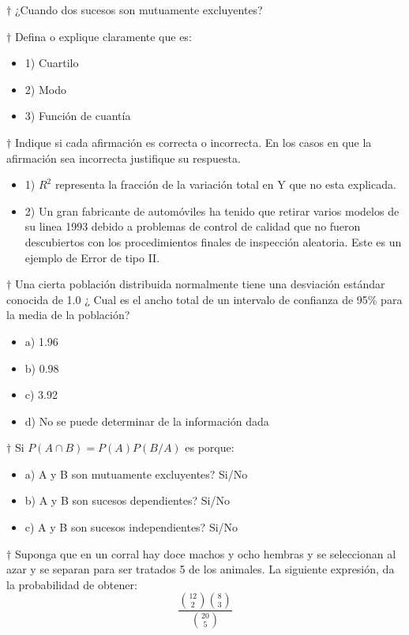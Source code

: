 \documentclass[10pt,a4paper]{article}
\begin{document}
$\dagger$ ¿Cuando dos sucesos son mutuamente excluyentes?

$\dagger$ Defina o explique claramente que es:
\begin{itemize}
	\item 1) Cuartilo
	\item 2) Modo
	\item 3) Función de cuantía
\end{itemize}

$\dagger$ Indique si cada afirmación es correcta o incorrecta. En los casos en que la afirmación sea incorrecta justifique su respuesta.
\begin{itemize}
	\item 1) $R^2$ representa la fracción de la variación total en Y que no esta explicada.
	\item 2) Un gran fabricante de automóviles ha tenido que retirar varios modelos de su linea 1993 debido a problemas de control de calidad que no fueron descubiertos con los procedimientos finales de inspección aleatoria. Este es un ejemplo de Error de tipo II.
\end{itemize}

$\dagger$ Una cierta población distribuida normalmente tiene una desviación estándar conocida de 1.0 ¿ Cual es el ancho total de un intervalo de confianza de 95\% para la media de la población?
\begin{itemize}
	\item a) 1.96
	\item b) 0.98
	\item c) 3.92
	\item d) No se puede determinar de la información dada
\end{itemize}

$\dagger$ Si $P(A\cap B) = P(A)P(B/A)$ es porque:
\begin{itemize}
	\item a) A y B son mutuamente excluyentes? Si/No
	\item b) A y B son sucesos dependientes? Si/No
	\item c) A y B son sucesos independientes? Si/No
\end{itemize}

$\dagger$ Suponga que en un corral hay doce machos y ocho hembras y se seleccionan al azar y se separan para ser tratados 5 de los animales. La siguiente expresión, da la probabilidad de obtener:
\begin{equation}
	\frac{\genfrac(){0pt}{2}{12}{2}\genfrac(){0pt}{2}{8}{3}}{\genfrac(){0pt}{2}{20}{5}}
\end{equation}
\end{document}
